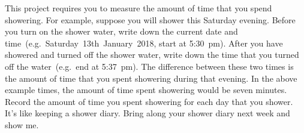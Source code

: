 \documentclass[a4paper,oneside,12pt]{article}
\begin{document}
\begin{problem}
\item This project requires you to measure the amount of time that you
  spend showering.  For example, suppose you will shower this Saturday
  evening.  Before you turn on the shower water, write down the
  current date and time~(e.g.~Saturday~13th~January~2018, start at
  5:30~pm).  After you have showered and turned off the shower water,
  write down the time that you turned off the water~(e.g.~end at
  5:37~pm).  The difference between these two times is the amount of
  time that you spent showering during that evening.  In the above
  example times, the amount of time spent showering would be seven
  minutes.  Record the amount of time you spent showering for each day
  that you shower.  It's like keeping a shower diary.  Bring along
  your shower diary next week and show me.
\end{problem}
\end{document}
